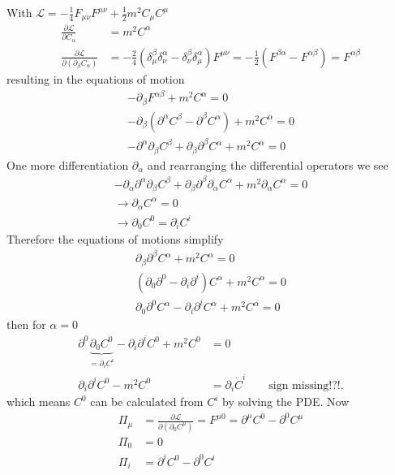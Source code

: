 \documentclass[../main.tex]{subfiles}
\begin{document}
With $\mathcal{L}=-\frac{1}{4}F_{\mu\nu}F^{\mu\nu}+\frac{1}{2}m^2C_\mu C^\mu$
\begin{align}
\frac{\partial\mathcal{L}}{\partial C_\alpha}&=m^2C^\alpha\\
\frac{\partial\mathcal{L}}{\partial(\partial_\beta C_\alpha)}&=-\frac{2}{4}(\delta^\beta_\mu\delta^\alpha_\nu-\delta^\beta_\nu\delta^\alpha_\mu)F^{\mu\nu}=-\frac{1}{2}(F^{\beta\alpha}-F^{\alpha\beta})=F^{\alpha\beta}
\end{align}
resulting in the equations of motion
\begin{align}
-\partial_\beta F^{\alpha\beta}+m^2C^\alpha=0\\
-\partial_\beta (\partial^\alpha C^\beta-\partial^\beta C^\alpha)+m^2C^\alpha=0\\
-\partial^\alpha \partial_\beta C^\beta+\partial_\beta\partial^\beta C^\alpha+m^2C^\alpha=0
\end{align}
One more differentiation $\partial_\alpha$ and rearranging the differential operators we see
\begin{align}
-\partial_\alpha\partial^\alpha\partial_\beta C^\beta+\partial_\beta\partial^\beta \partial_\alpha C^\alpha+m^2\partial_\alpha C^\alpha=0\\
\rightarrow\partial_\alpha C^\alpha=0\\
\rightarrow\partial_0C^0=\partial_iC^i
\end{align}
Therefore the equations of motions simplify
\begin{align}
\partial_\beta\partial^\beta C^\alpha+m^2C^\alpha=0\\
(\partial_0\partial^0-\partial_i\partial^i) C^\alpha+m^2C^\alpha=0\\
\partial_0\partial^0C^\alpha-\partial_i\partial^i C^\alpha+m^2C^\alpha=0
\end{align}
then for $\alpha=0$
\begin{align}
\partial^0\underbrace{\partial_0C^0}_{=\partial_iC^i}-\partial_i\partial^i C^0+m^2C^0&=0\\
\partial_i\partial^i C^0-m^2C^0&=\partial_i\dot{C}^i\qquad\text{sign missing!?!}.
\end{align}
which means $C^0$ can be calculated from $C^i$ by solving the PDE. Now
\begin{align}
\Pi_\mu
&=\frac{\partial\mathcal{L}}{\partial(\partial_0C^\mu)}=F^{\mu0}=\partial^\mu C^0-\partial^0C^\mu\\
\Pi_0&=0\\
\Pi_i&=\partial^iC^0-\partial^0C^i
\end{align}
\end{document}
